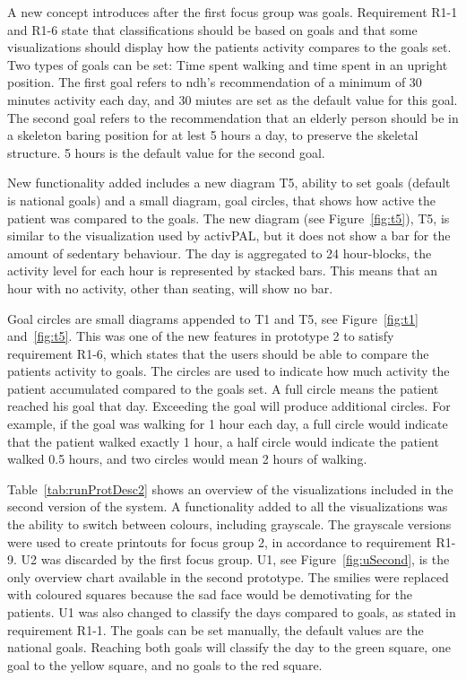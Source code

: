 A new concept introduces after the first focus group was goals. Requirement R1-1 and R1-6 state that classifications should be based on goals and that some visualizations should display how the patients activity compares to the goals set. Two types of goals can be set: Time spent walking and time spent in an upright position. The first goal refers to \gls{ndh}'s recommendation of a minimum of 30 minutes activity each day, and 30 miutes are set as the default value for this goal. The second goal refers to the recommendation that an elderly person should be in a skeleton baring position for at lest 5 hours a day, to preserve the skeletal structure. 5 hours is the default value for the second goal.

New functionality added includes a new diagram T5, ability to set goals (default is national goals) and a small diagram, goal circles, that shows how active the patient was compared to the goals. The new diagram (see Figure~\ref{fig:t5}), T5, is similar to the visualization used by activPAL, but it does not show a bar for the amount of sedentary behaviour. The day is aggregated to 24 hour-blocks, the activity level for each hour is represented by stacked bars. This means that an hour with no activity, other than seating, will show no bar. 

Goal circles are small diagrams appended to T1 and T5, see Figure~\ref{fig:t1} and~\ref{fig:t5}. This was one of the new features in prototype 2 to satisfy requirement R1-6, which states that the users should be able to compare the patients activity to goals.  The circles are used to indicate how much activity the patient accumulated compared to the goals set. A full circle means the patient reached his goal that day. Exceeding the goal will produce additional circles. For example, if the goal was walking for 1 hour each day, a full circle would indicate that the patient walked exactly 1 hour, a half circle would indicate the patient walked 0.5 hours, and two circles would mean 2 hours of walking.

Table~\ref{tab:runProtDesc2} shows an overview of the visualizations included in the second version of the system. A functionality added to all the visualizations was the ability to switch between colours, including grayscale. The grayscale versions were used to create printouts for focus group 2, in accordance to requirement R1-9. U2 was discarded by the first focus group. U1, see Figure~\ref{fig:uSecond}, is the only overview chart available in the second prototype. The smilies were replaced with coloured squares because the sad face would be demotivating for the patients. U1 was also changed to classify the days compared to goals, as stated in requirement R1-1. The goals can be set manually, the default values are the national goals. Reaching both goals will classify the day to the green square, one goal to the yellow square, and no goals to the red square.

